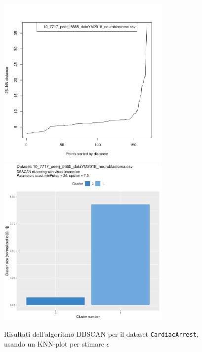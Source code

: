 \documentclass[a4paper, 12pt]{report}
\begin{document}
			\begin{figure}[H]
				\centering
				\includegraphics[width = 0.75\textwidth, height = 0.45\textheight, page = 2]{
					doc/DBSCAN_optimal_MinPts.pdf
				}
				\includegraphics[width = 0.75\textwidth, height = 0.45\textheight, page = 2]{
					results/DBSCAN_visual_comparison.pdf
				}
				\caption{Risultati dell'algoritmo DBSCAN per il dataset
				\texttt{CardiacArrest}, usando un KNN-plot per stimare $\epsilon$}
				\label{fig:dbscan-extra2}
			\end{figure}
\end{document}
